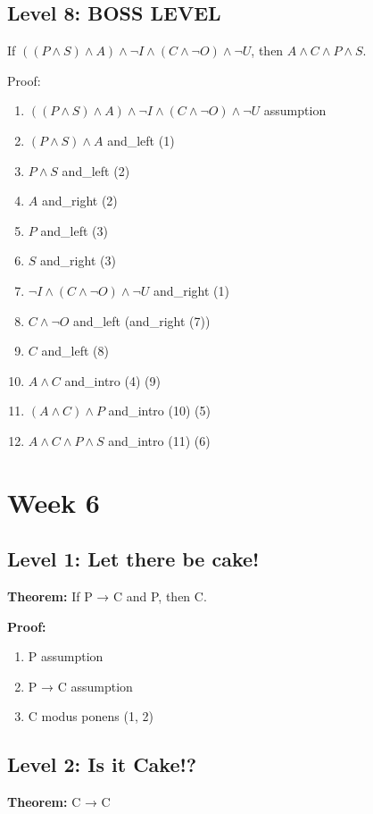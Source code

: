 \documentclass{article}
\theoremstyle{theorem}
\theoremstyle{definition}
\theoremstyle{remark}
\begin{document}
\subsection{Level 8: BOSS LEVEL}
If $((P \wedge S) \wedge A) \wedge \neg I \wedge (C \wedge \neg O) \wedge \neg U$, then $A \wedge C \wedge P \wedge S$.

Proof:
\begin{enumerate}
    \item $((P \wedge S) \wedge A) \wedge \neg I \wedge (C \wedge \neg O) \wedge \neg U$ \hfill assumption
    \item $(P \wedge S) \wedge A$ \hfill and\_left (1)
    \item $P \wedge S$ \hfill and\_left (2)
    \item $A$ \hfill and\_right (2)
    \item $P$ \hfill and\_left (3)
    \item $S$ \hfill and\_right (3)
    \item $\neg I \wedge (C \wedge \neg O) \wedge \neg U$ \hfill and\_right (1)
    \item $C \wedge \neg O$ \hfill and\_left (and\_right (7))
    \item $C$ \hfill and\_left (8)
    \item $A \wedge C$ \hfill and\_intro (4) (9)
    \item $(A \wedge C) \wedge P$ \hfill and\_intro (10) (5)
    \item $A \wedge C \wedge P \wedge S$ \hfill and\_intro (11) (6)
\end{enumerate}

\section{Week 6}

\subsection{Level 1: Let there be cake!}
\textbf{Theorem:} If P → C and P, then C.

\textbf{Proof:}
\begin{enumerate}
    \item P \hfill assumption
    \item P → C \hfill assumption
    \item C \hfill modus ponens (1, 2)
\end{enumerate}

\subsection{Level 2: Is it Cake!?}
\textbf{Theorem:} C → C
\end{document}

